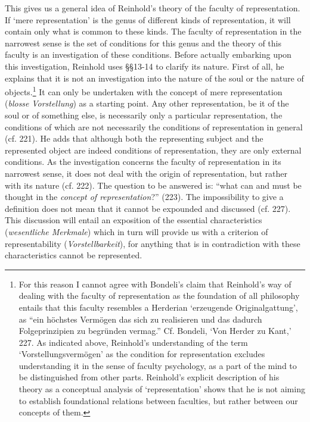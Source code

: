  This gives us a general idea of Reinhold's theory of the faculty of representation. If `mere representation' is the genus of different kinds of representation, it will contain only what is common to these kinds. The faculty of representation in the narrowest sense is the set of conditions for this genus and the theory of this faculty is an investigation of these conditions. Before actually embarking upon this investigation, Reinhold uses \S \S  13{-}14 to clarify its nature. First of all, he explains that it is not an investigation into the nature of the soul or the nature of objects.\footnote{ For this reason I cannot agree with Bondeli's claim that Reinhold's way of dealing with the faculty of representation as the foundation of all philosophy entails that this faculty resembles a Herderian `erzeugende Originalgattung', as ``ein h\"{o}chstes Verm\"{o}gen das sich zu realisieren und das dadurch Folgeprinzipien zu begr\"{u}nden vermag.'' Cf. Bondeli, `Von Herder zu Kant,' 227. As indicated above, Reinhold's understanding of the term `Vorstellungsverm\"{o}gen' as the condition for representation excludes understanding it in the sense of faculty psychology, as a part of the mind to be distinguished from other parts. Reinhold's explicit description of his theory as a conceptual analysis of `representation' shows that he is not aiming to establish foundational relations between faculties, but rather between our concepts of them. } It can only be undertaken with the concept of mere representation (\textit{blosse} \textit{Vorstellung}) as a starting point. Any other representation, be it of the soul or of something else, is necessarily only a particular representation, the conditions of which are not necessarily the conditions of representation in general (cf. 221). He adds that although both the representing subject and the represented object are indeed conditions of representation, they are only external conditions. As the investigation concerns the faculty of representation in its narrowest sense, it does not deal with the origin of representation, but rather with its nature (cf. 222). The question to be answered is: ``what can and must be thought in the \textit{concept of representation}?'' (223). The impossibility to give a definition does not mean that it cannot be expounded and discussed (cf. 227). This discussion will entail an exposition of the essential characteristics (\textit{wesentliche Merkmale}) which in turn will provide us with a criterion of representability (\textit{Vorstellbarkeit}), for anything that is in contradiction with these characteristics cannot be represented. 

